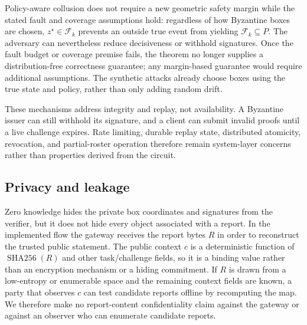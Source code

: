\documentclass[preprint,review,12pt]{elsarticle}
\newcommand{\F}{\mathcal{F}_k}
\begin{document}
Policy-aware collusion does not require a new geometric safety margin while the stated fault and coverage assumptions hold: regardless of how Byzantine boxes are chosen, $z^\star\in\F$ prevents an outside true event from yielding $\F\subseteq P$. The adversary can nevertheless reduce decisiveness or withhold signatures. Once the fault budget or coverage premise fails, the theorem no longer supplies a distribution-free correctness guarantee; any margin-based guarantee would require additional assumptions. The synthetic attacks already choose boxes using the true state and policy, rather than only adding random drift.

These mechanisms address integrity and replay, not availability. A Byzantine issuer can still withhold its signature, and a client can submit invalid proofs until a live challenge expires. Rate limiting, durable replay state, distributed atomicity, revocation, and partial-roster operation therefore remain system-layer concerns rather than properties derived from the circuit.

\subsection{Privacy and leakage}
Zero knowledge hides the private box coordinates and signatures from the verifier, but it does not hide every object associated with a report. In the implemented flow the gateway receives the report bytes $R$ in order to reconstruct the trusted public statement. The public context $c$ is a deterministic function of $\operatorname{SHA256}(R)$ and other task/challenge fields, so it is a binding value rather than an encryption mechanism or a hiding commitment. If $R$ is drawn from a low-entropy or enumerable space and the remaining context fields are known, a party that observes $c$ can test candidate reports offline by recomputing the map. We therefore make no report-content confidentiality claim against the gateway or against an observer who can enumerate candidate reports.
\end{document}
